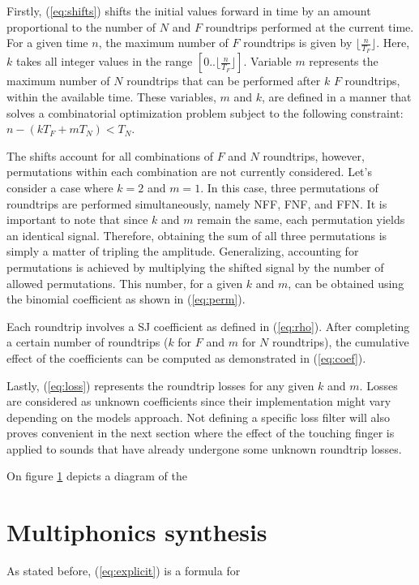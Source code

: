 \documentclass{sigchi}
\begin{document}
Firstly, (\ref{eq:shifts}) shifts the initial values forward in time by an amount proportional to the number of $N$ and $F$ roundtrips performed at the current time. For a given time $n$, the maximum number of $F$ roundtrips is given by $\lfloor \frac{n}{T_F} \rfloor$. Here, $k$ takes all integer values in the range $[0..\lfloor \frac{n}{T_F} \rfloor]$. Variable $m$ represents the maximum number of $N$ roundtrips that can be performed after $k$ $F$ roundtrips, within the available time. These variables, $m$ and $k$, are defined in a manner that solves a combinatorial optimization problem subject to the following constraint: $n - (kT_F + mT_N) < T_N$.

The shifts account for all combinations of $F$ and $N$ roundtrips, however, permutations within each combination are not currently considered.
Let's consider a case where $k = 2$ and $m = 1$. In this case, three permutations of roundtrips are performed simultaneously, namely NFF, FNF, and FFN.
It is important to note that since $k$ and $m$ remain the same, each permutation yields an identical signal.
Therefore, obtaining the sum of all three permutations is simply a matter of tripling the amplitude. Generalizing, accounting for permutations is achieved by multiplying the shifted signal by the number of allowed permutations.
This number, for a given $k$ and $m$, can be obtained using the binomial coefficient as shown in (\ref{eq:perm}).

Each roundtrip involves a SJ coefficient as defined in (\ref{eq:rho}).
After completing a certain number of roundtrips ($k$ for $F$ and $m$ for $N$ roundtrips), the cumulative effect of the coefficients can be computed as demonstrated in (\ref{eq:coef}).

Lastly, (\ref{eq:loss}) represents the roundtrip losses for any given $k$ and $m$. Losses are considered as unknown coefficients since their implementation might vary depending on the models approach. Not defining a specific loss filter will also proves convenient in the next section where the effect of the touching finger is applied to sounds that have already undergone some unknown roundtrip losses.

\begin{figure}[h]
	\centering
	\scalebox{1}{}
	\caption{}
	\label{fig:triangle}
\end{figure}

On figure \ref{fig:triangle} depicts a diagram of the 

\section{Multiphonics synthesis}
As stated before, (\ref{eq:explicit}) is a formula for
\end{document}

